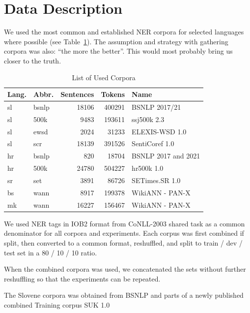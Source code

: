\documentclass[sigconf]{acmart}
\begin{document}
\section{Data Description}
\label{sec:data-description}
We used the most common and established NER corpora for selected languages where possible (see Table~\ref{tab:corpora}).
The assumption and strategy with gathering corpora was also: ``the more the better''.
This would most probably bring us closer to the truth.
\begin{table}[H]
  \caption{List of Used Corpora}
  \label{tab:corpora}
  \begin{tabular}{llrrl}
    \toprule
    Lang.&Abbr.&Sentences&Tokens&Name\\
    \midrule
    sl&bsnlp&18106&400291&BSNLP 2017/21\cite{piskorski-etal-2021-slav}\\
    sl&500k&9483&193611&ssj500k 2.3\cite{ssj500k-23}\\
    sl&ewsd&2024&31233&{ELEXIS}-{WSD} 1.0\cite{ELEXIS-WSD-10}\\
    sl&scr&18139&391526&{SentiCoref} 1.0\cite{SentiCoref-10}\\
    \midrule
    hr&bsnlp&820&18704&BSNLP 2017 and 2021\cite{piskorski-etal-2021-slav}\\
    hr&500k&24780&504227&hr500k 1.0\cite{hr500k-10}\\
    \midrule
    sr&set&3891&86726&{SETimes}.{SR} 1.0\cite{SETimes-SR-1.0}\\
    \midrule
    bs&wann&8917&199378&WikiANN - PAN-X\cite{rahimi-etal-2019-massively}\\
    \midrule
    mk&wann&16227&156467&WikiANN - PAN-X\cite{rahimi-etal-2019-massively}\\
  \bottomrule
  \end{tabular}
\end{table}
 We used NER tags in IOB2\cite{IOB2} format from CoNLL-2003 shared task\cite{CoNLL2003} as a common denominator for all corpora and experiments.
Each corpus was first combined if split, then converted to a common format, reshuffled, and split to train / dev / test set in a 80 / 10 / 10 ratio.

When the combined corpora was used, we concatenated the sets without further reshuffling so that the experiments can be repeated.

The Slovene corpora was obtained from BSNLP and parts of a newly published combined Training corpus {SUK} 1.0\cite{SUK-1.0}
\end{document}
